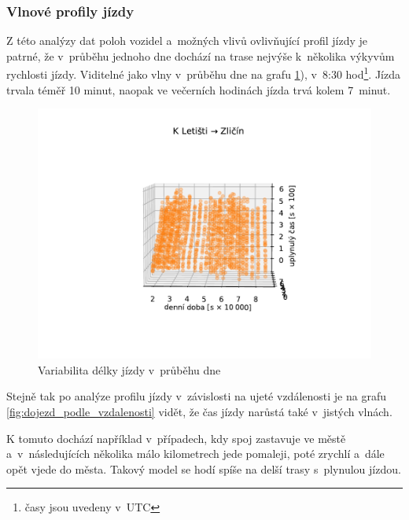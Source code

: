 \subsubsection{Vlnové profily jízdy} \label{subsubsection:vlny}


Z této analýzy dat poloh vozidel a~možných vlivů ovlivňující profil jízdy je patrné, že v~průběhu jednoho dne dochází na trase nejvýše k~několika výkyvům rychlosti jízdy. Viditelné jako vlny v~průběhu dne na grafu \ref{fig:dojezd_ve_fazich_dne}), v~8:30 hod\footnote{časy jsou uvedeny v~UTC}. Jízda trvala téměř 10 minut, naopak ve večerních hodinách jízda trvá kolem 7~minut.


\begin{figure}
\centering
  \includegraphics[width=\linewidth]{../img/dojezd_ve_fazich_dne}
  \caption{Variabilita délky jízdy v~průběhu dne}
  \label{fig:dojezd_ve_fazich_dne}
\end{figure}

\bigbreak

Stejně tak po analýze profilu jízdy v~závislosti na ujeté vzdálenosti je na grafu \ref{fig:dojezd_podle_vzdalenosti} vidět, že čas jízdy narůstá také v~jistých vlnách.

\bigbreak

K tomuto dochází například v~případech, kdy spoj zastavuje ve městě a~v~následujících několika málo kilometrech jede pomaleji, poté zrychlí a~dále opět vjede do města. Takový model se hodí spíše na delší trasy s~plynulou jízdou.


